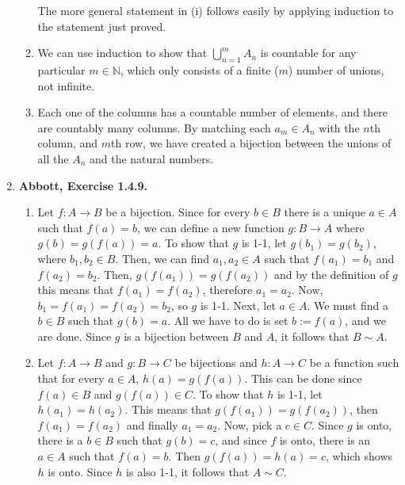 \documentclass{article}
\newcommand{\N}{\mathbb{N}}
\newcommand{\exc}[2][Abbott]{\item \textbf{#1, Exercise #2.}}
\begin{document}
\begin{enumerate}
\begin{enumerate}
		      The more general statement in (i) follows easily by applying induction to the statement just proved.
		      		      		      	      	      	      	        
		\item We can use induction to show that $\bigcup_{n=1}^m A_n$ is countable for any particular $m \in \N$, which only consists of a finite ($m$) number of unions, not infinite.
		      		      		      	      	      	      	        
		\item Each one of the columns has a countable number of elements, and there are countably many columns. By matching each $a_m \in A_n$ with the $n$th column, and $m$th row, we have created a bijection between the unions of all the $A_n$ and the natural numbers.
	\end{enumerate}
				      	          
	\exc{1.4.9}
				      	          
	\begin{enumerate}
		\item Let $f : A \rightarrow B$ be a bijection. Since for every $b \in B$ there is a unique $a \in A$ such that $f(a) = b$, we can define a new function $g: B \rightarrow A$ where $g(b) = g(f(a)) = a$. To show that $g$ is 1-1, let $g(b_1) = g(b_2)$, where $b_1,b_2 \in B$. Then, we can find $a_1, a_2 \in A$ such that $f(a_1) = b_1$ and $f(a_2) = b_2$. Then, $g(f(a_1)) = g(f(a_2))$ and by the definition of $g$ this means that $f(a_1) = f(a_2)$, therefore $a_1 = a_2$. Now, $b_1 = f(a_1) = f(a_2) = b_2$, so $g$ is 1-1. Next, let $a \in A$. We must find a $b \in B$ such that $g(b) = a$. All we have to do is set $b := f(a)$, and we are done. Since $g$ is a bijection between $B$ and $A$, it follows that $B \sim A$.
		      		      		      	      	      	      	              
		\item Let $f : A \rightarrow B$ and $g : B \rightarrow C$ be bijections and $h : A \rightarrow C$ be a function such that for every $a \in A$, $h(a) = g(f(a))$. This can be done since $f(a) \in B$ and $g(f(a)) \in C$. To show that $h$ is 1-1, let $h(a_1) = h(a_2)$. This means that $g(f(a_1)) = g(f(a_2))$, then $f(a_1) = f(a_2)$ and finally $a_1 = a_2$. Now, pick a $c \in C$.  Since $g$ is onto, there is a $b \in B$ such that $g(b) = c$, and since $f$ is onto, there is an $a \in A$ such that $f(a)=b$. Then $g(f(a)) = h(a) = c$, which shows $h$ is onto. Since $h$ is also 1-1, it follows that $A \sim C$.
	\end{enumerate}
				      	          

\end{enumerate}
\end{document}
